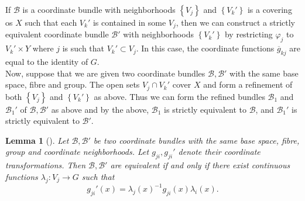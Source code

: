 \documentclass[reqno]{amsart}
\newtheorem{lemma}[theorem]{Lemma}
\theoremstyle{definition}
\theoremstyle{remark}
\begin{document}
If $\mathcal{B}$ is a coordinate bundle with neighborhoods
$\left\{ V_j \right\} $ and
$\left\{ V_k' \right\} $ is a covering os $X$ such that
each  $V_{k}'$ is contained in some $V_j$, then
we can construct a strictly equivalent coordinate
bundle $\mathcal{B}'$ with neighborhoods
$\left\{ V_k' \right\} $ by restricting
$\varphi_j$ to $V_{k}' \times Y$ where
$j$ is such that $V_{k}' \subset V_j$. In this case,
the coordinate functions $\overline{g}_{kj}$ are equal to
the identity of $G$.\\
Now, suppose that we are given two
coordinate bundles $\mathcal{B},\mathcal{B}'$ with the same
base space, fibre and group. The open sets
$V_j \cap V_k'$ cover $X$ and form a refinement of both
$\left\{ V_j \right\} $ and $\left\{ V_k' \right\} $ as above.
Thus we can form the refined bundles $\mathcal{B}_1$ and
$\mathcal{B}_1'$ of $\mathcal{B},\mathcal{B}'$ as above and
by the above, $\mathcal{B}_1$ is strictly equivalent to
$\mathcal{B}$, and $\mathcal{B}_1'$ is strictly equivalent to
$\mathcal{B}'$.

\begin{lemma}[]
    Let $\mathcal{B},\mathcal{B}'$ be two coordinate bundles
    with the same base space, fibre, group and coordinate
    neighborhoods. Let
    $g_{ji}, g_{ji}'$ denote their coordinate transformations.
    Then $\mathcal{B}, \mathcal{B}'$ are equivalent
    if and only if there exist continuous functions
    $\lambda_j \colon V_j \to G$ such that
    \[
    g_{ji}'(x) = \lambda_j(x)^{-1} g_{ji}(x)
    \lambda_i(x).
    \] 
\end{lemma}
\end{document}

